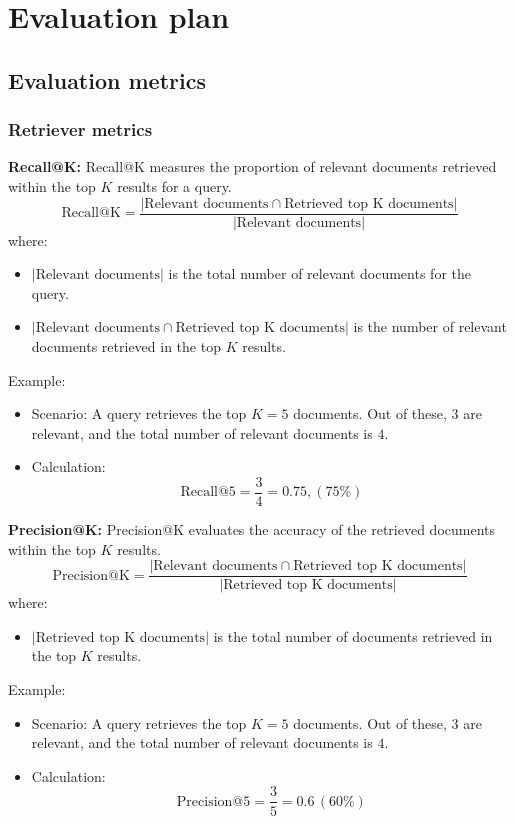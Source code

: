 \chapter{Evaluation plan}

\section{Evaluation metrics}
\subsection{Retriever metrics}
\textbf{Recall@K:}
    Recall@K measures the proportion of relevant documents retrieved within the top $K$ results for a query.
    \[
    \text{Recall@K} = \frac{| \text{Relevant documents} \cap \text{Retrieved top K documents} |}{|\text{Relevant documents}|}
    \]
    where:
    \begin{itemize}
        \item $|\text{Relevant documents}|$ is the total number of relevant documents for the query.
        \item $| \text{Relevant documents} \cap \text{Retrieved top K documents} |$ is the number of relevant documents retrieved in the top $K$ results.
    \end{itemize}
    Example:
    \begin{itemize}
        \item Scenario: A query retrieves the top \( K = 5 \) documents. Out of these, \( 3 \) are relevant, and the total number of relevant documents is \( 4 \).

        \item Calculation:
        \begin{equation*}
        \text{Recall@5} = \frac{3}{4} = 0.75 ,(75\%)
        \end{equation*}

    \end{itemize}


\textbf{Precision@K:}
    Precision@K evaluates the accuracy of the retrieved documents within the top $K$ results.
    \[
    \text{Precision@K} = \frac{| \text{Relevant documents} \cap \text{Retrieved top K documents} |}{|\text{Retrieved top K documents}|}
    \]
    where:
    \begin{itemize}
        \item $|\text{Retrieved top K documents}|$ is the total number of documents retrieved in the top $K$ results.
    \end{itemize}
    Example:
    \begin{itemize}
        \item Scenario: A query retrieves the top \( K = 5 \) documents. Out of these, \( 3 \) are relevant, and the total number of relevant documents is \( 4 \).

		\item Calculation:
        \begin{equation*}
        \text{Precision@5} = \frac{3}{5} = 0.6 \,(60\%)
        \end{equation*}

    \end{itemize}

